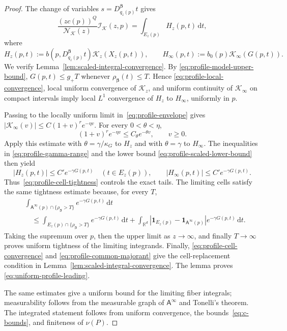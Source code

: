 \documentclass[11pt]{amsart}
\numberwithin{equation}{section}
\theoremstyle{definition}
\theoremstyle{remark}
\newcommand{\R}{\mathbb{R}}
\newcommand{\ind}{\mathbf{1}}
\newcommand{\dd}{\,\mathrm{d}}
\newcommand{\cI}{\mathcal{I}}
\newcommand{\Afib}{\mathsf{A}}
\begin{document}
\begin{proof}
The change of variables $s=D_{q_z(p)}^{\bm\beta}t$ gives
\begin{equation}\label{eq:profile-scaled-proof}
 \frac{(zc(p))^Q}{\mathcal N_{\mathcal K}(z)}\cI_{\mathcal K}(z,p)
 =\int_{E_z(p)}H_z(p,t)\dd t,
\end{equation}
where
\[
 H_z(p,t):=b(p,D_{q_z(p)}^{\bm\beta}t)\mathcal K_z(X_z(p,t)),
 \qquad
 H_\infty(p,t):=b_0(p)\mathcal K_\infty(G(p,t)).
\]
We verify Lemma~\ref{lem:scaled-integral-convergence}.  By
\eqref{eq:profile-model-upper-bound}, $G(p,t)\le g_+T$ whenever
$\rho_{\bm\beta}(t)\le T$.  Hence
\eqref{eq:profile-local-convergence}, local uniform convergence of $\mathcal K_z$, and
uniform continuity of $\mathcal K_\infty$ on compact intervals imply local $L^1$
convergence of $H_z$ to $H_\infty$, uniformly in $p$.

Passing to the locally uniform limit in~\eqref{eq:profile-envelope} gives
$|\mathcal K_\infty(v)|\le C(1+v)^r e^{-\eta v}$.  For every
$0<\theta<\eta$,
\[
 (1+v)^r e^{-\eta v}\le C_\theta e^{-\theta v},
 \qquad v\ge0.
\]
Apply this estimate with $\theta=\gamma/\kappa_G$ to $H_z$ and with
$\theta=\gamma$ to $H_\infty$.  The inequalities in
\eqref{eq:profile-gamma-range} and the lower bound
\eqref{eq:profile-scaled-lower-bound} then yield
\begin{equation}\label{eq:profile-common-majorant}
 |H_z(p,t)|\le C'e^{-\gamma G(p,t)}
 \quad(t\in E_z(p)),
 \qquad
 |H_\infty(p,t)|\le C'e^{-\gamma G(p,t)}.
\end{equation}
Thus~\eqref{eq:profile-cell-tightness} controls the exact tails.  The limiting
cells satisfy the same tightness estimate because, for every $T$,
\begin{align*}
 &\int_{\Afib^\infty(p)\cap\{\rho_{\bm\beta}>T\}}
 e^{-\gamma G(p,t)}\dd t\\
 &\quad\le
 \int_{E_z(p)\cap\{\rho_{\bm\beta}>T\}}
 e^{-\gamma G(p,t)}\dd t
 +\int_{\R^d}|\ind_{E_z(p)}-\ind_{\Afib^\infty(p)}|
 e^{-\gamma G(p,t)}\dd t.
\end{align*}
Taking the supremum over $p$, then the upper limit as $z\to\infty$, and finally
$T\to\infty$ proves uniform tightness of the limiting integrands.  Finally,
\eqref{eq:profile-cell-convergence} and
\eqref{eq:profile-common-majorant} give the cell-replacement condition in
Lemma~\ref{lem:scaled-integral-convergence}.  The lemma proves
\eqref{eq:uniform-profile-leading}.

The same estimates give a uniform bound for the limiting fiber integrals;
measurability follows from the measurable graph of $\Afib^\infty$ and Tonelli's
theorem.  The integrated statement follows from uniform convergence, the
bounds~\eqref{eq:c-bounds}, and finiteness of $\nu(P)$.
\end{proof}
\end{document}
